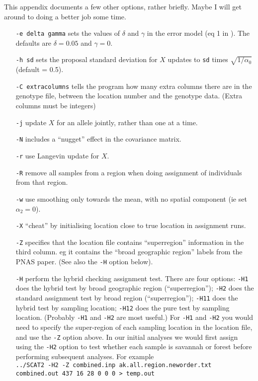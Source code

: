 \documentclass[11pt,titlepage,times,letterpaper]{article}
\begin{document}
This appendix documents a few other options, rather briefly.  Maybe I
will get around to doing a better job some time.
\begin{enumerate}[{\tt -f}]
\item[{\tt -e delta gamma}] sets the values of $\delta$ and $\gamma$
in the error model (eq 1 in \cite{wasser.etal.04}). The defaults are
$\delta = 0.05$ and $\gamma = 0$.  
\item[{\tt -h sd}] sets the
proposal standard deviation for $X$ updates to {\tt sd} times
$\sqrt{1/\alpha_0}$ (default = 0.5).  
\item[{\tt -C extracolumns}] tells the program how many extra columns there
are in the genotype file, between the location number and the genotype
data. (Extra columns must be integers)
\item[{\tt -j}] update $X$ for an allele jointly, rather than one at a time.
\item[{\tt -N}] includes a
``nugget'' effect in the covariance matrix.  
\item[{\tt -r}] use Langevin update for $X$.  
\item[{\tt -R}] remove
all samples from a region when doing assignment of individuals from
that region.
\item[{\tt -w}] use smoothing only towards the mean, with no spatial component (ie set
$\alpha_2 = 0$).
\item[{\tt -X}] ``cheat'' by initialising location close to true location in assignment runs.
\item[{\tt -Z}] specifies that the location file contains ``superregion'' information in the third column.
eg it contains the ``broad geographic region'' labels from the PNAS paper. (See also the {\tt -H} option below).
\item[{\tt -H}] perform the hybrid checking assignment test. There are
four options: {\tt -H1} does the hybrid test by broad geographic
region (``superregion''); {\tt -H2} does the standard assignment test
by broad region (``superregion''); {\tt -H11} does the hybrid test by
sampling location; {\tt -H12} does the pure test by sampling
location. (Probably {\tt -H1} and {\tt -H2} are most useful.)  For {\tt -H1} and {\tt -H2} you would need to specify the super-region of
each sampling location in the location file, and use the {\tt -Z} option above. In our
initial analyses we would first assign using the {\tt -H2} option to test
whether each sample is savannah or forest before performing subsequent analyses.
For example \\ {\tt ../SCAT2 -H2 -Z combined.inp ak.all.region.neworder.txt combined.out 437 16 28 0 0 0 > temp.out}


\end{enumerate}
\end{document}
